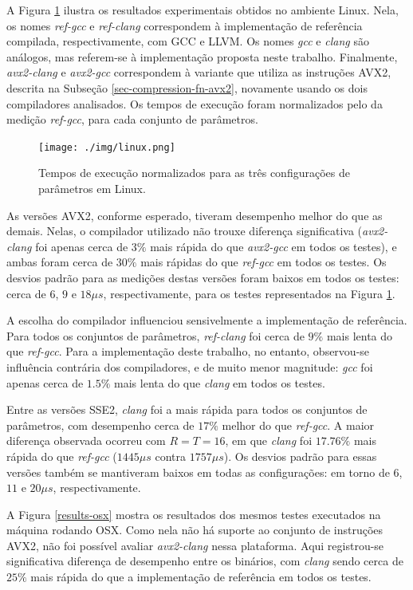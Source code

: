 \documentclass{article}
\begin{document}
A Figura \ref{results-linux} ilustra os resultados experimentais obtidos
no ambiente Linux. Nela, os nomes \emph{ref-gcc} e \emph{ref-clang}
correspondem à implementação de referência compilada, respectivamente,
com GCC e LLVM. Os nomes \emph{gcc} e \emph{clang} são análogos, mas
referem-se à implementação proposta neste trabalho. Finalmente,
\emph{avx2-clang} e \emph{avx2-gcc} correspondem à variante que utiliza
as instruções AVX2, descrita na Subseção \ref{sec-compression-fn-avx2},
novamente usando os dois compiladores analisados. Os tempos de execução
foram normalizados pelo da medição \emph{ref-gcc}, para cada conjunto de
parâmetros.

\begin{figure}[htbp]
\centering
\texttt{[image: ./img/linux.png]}
\caption{Tempos de execução normalizados para as três configurações de parâmetros em Linux\label{results-linux}.}
\end{figure}

As versões AVX2, conforme esperado, tiveram desempenho melhor do que as
demais. Nelas, o compilador utilizado não trouxe diferença significativa
(\emph{avx2-clang} foi apenas cerca de $3\%$ mais rápida do que
\emph{avx2-gcc} em todos os testes), e ambas foram cerca de $30\%$
mais rápidas do que \emph{ref-gcc} em todos os testes. Os desvios padrão
para as medições destas versões foram baixos em todos os testes: cerca de $6$,
$9$ e $18 \mu s$, respectivamente, para os testes representados na Figura
\ref{results-linux}.

A escolha do compilador influenciou sensivelmente a implementação de
referência. Para todos os conjuntos de parâmetros, \emph{ref-clang} foi cerca
de $9\%$ mais lenta do que \emph{ref-gcc}. Para a implementação deste trabalho,
no entanto, observou-se influência contrária dos compiladores, e de muito menor
magnitude: \emph{gcc} foi apenas cerca de $1.5\%$ mais lenta do que \emph{clang}
em todos os testes.

Entre as versões SSE2, \emph{clang} foi a mais rápida para todos os conjuntos
de parâmetros, com desempenho cerca de $17\%$ melhor do que \emph{ref-gcc}. A
maior diferença observada ocorreu com $R = T = 16$, em que \emph{clang} foi
$17.76\%$ mais rápida do que \emph{ref-gcc} ($1445 \mu s$ contra $1757 \mu s$).
Os desvios padrão para essas versões também se mantiveram baixos em todas as
configurações: em torno de $6$, $11$ e $20 \mu s$, respectivamente.

A Figura \ref{results-osx} mostra os resultados dos mesmos testes
executados na máquina rodando OSX. Como nela não há suporte ao conjunto
de instruções AVX2, não foi possível avaliar \emph{avx2-clang} nessa
plataforma. Aqui registrou-se significativa diferença de desempenho entre os
binários, com \emph{clang} sendo cerca de $25\%$ mais rápida do que a
implementação de referência em todos os testes.
\end{document}
